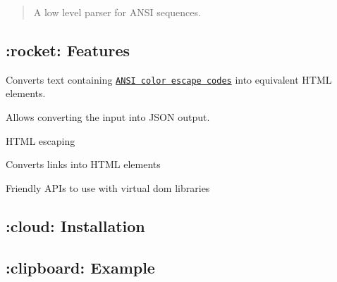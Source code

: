 \href{https://www.patreon.com/ionicabizau}{\tt } \href{http://amzn.eu/hRo9sIZ}{\tt } \href{https://www.paypal.com/cgi-bin/webscr?cmd=_s-xclick&hosted_button_id=RVXDDLKKLQRJW}{\tt } \href{https://travis-ci.org/IonicaBizau/anser/}{\tt } \href{https://www.npmjs.com/package/anser}{\tt } \href{https://www.npmjs.com/package/anser}{\tt }

\begin{quote}
A low level parser for A\+N\+SI sequences. \end{quote}


\subsection*{\+:rocket\+: Features}


\begin{DoxyItemize}
\item Converts text containing \href{http://en.wikipedia.org/wiki/ANSI_escape_code#Colors}{\tt A\+N\+SI color escape codes} into equivalent H\+T\+ML elements.
\item Allows converting the input into J\+S\+ON output.
\item H\+T\+ML escaping
\item Converts links into H\+T\+ML elements
\item Friendly A\+P\+Is to use with virtual dom libraries
\end{DoxyItemize}

\subsection*{\+:cloud\+: Installation}




\subsection*{\+:clipboard\+: Example}


